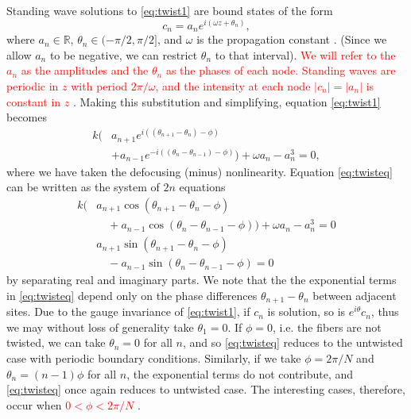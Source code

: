 \documentclass[reprint, amsmath,amssymb,aps,pra]{revtex4-2}
\def\R{{\mathbb R}}
\renewcommand{\revised}[1]{ \textcolor{red}{#1} }
\begin{document}
Standing wave solutions to \cref{eq:twist1} are bound states of the form
\begin{equation}\label{eq:ansatz1}
c_n = a_n e^{i (\omega z + \theta_n) },
\end{equation}
where $a_n \in \R$, $\theta_n \in (-\pi/2, \pi/2]$, and $\omega$ is the propagation constant . (Since we allow $a_n$ to be negative, we can restrict $\theta_n$ to that interval). \revised{We will refer to the $a_n$ as the amplitudes and the $\theta_n$ as the phases of each node. Standing waves are periodic in $z$ with period $2\pi/\omega$, and the intensity at each node $|c_n| = |a_n|$ is constant in $z$}.
Making this substitution and simplifying, equation \cref{eq:twist1} becomes
\begin{equation}\label{eq:twisteq}
\begin{aligned}
k\Big( &a_{n+1} e^{i((\theta_{n+1}-\theta_n)-\phi)} \\
&+ a_{n-1} e^{-i((\theta_n - \theta_{n-1})-\phi)}\Big) + \omega a_n - a_n^3 = 0,
\end{aligned}
\end{equation}
where we have taken the defocusing (minus) nonlinearity. Equation \cref{eq:twisteq} can be written as the system of $2n$ equations
\begin{equation}\label{eq:twisteqreal}
\begin{aligned}
k\big( &a_{n+1} \cos(\theta_{n+1}-\theta_n-\phi) \\
&\quad+a_{n-1} \cos(\theta_n - \theta_{n-1}-\phi)\big) + \omega a_n -  a_n^3 = 0 \\\
&a_{n+1} \sin(\theta_{n+1}-\theta_n-\phi) \\
&\quad-a_{n-1} \sin(\theta_n - \theta_{n-1}-\phi) = 0
\end{aligned}
\end{equation}
by separating real and imaginary parts. We note that the the exponential terms in \cref{eq:twisteq} depend only on the phase differences $\theta_{n+1}-\theta_n$ between adjacent sites. Due to the gauge invariance of \cref{eq:twist1}, if $c_n$ is solution, so is $e^{i \theta} c_n$, thus we may without loss of generality take $\theta_1 = 0$. If $\phi = 0$, i.e. the fibers are not twisted, we can take $\theta_n = 0$ for all $n$, and so \cref{eq:twisteq} reduces to the untwisted case with periodic boundary conditions. Similarly, if we take $\phi = 2 \pi/N$ and $\theta_n = (n-1)\phi$ for all $n$, the exponential terms do not contribute, and \cref{eq:twisteq} once again reduces to untwisted case. The interesting cases, therefore, occur when \revised{$0 < \phi < 2 \pi/N$}. 
\end{document}
